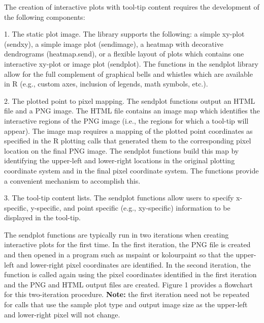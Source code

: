 \documentclass[]{article}
\begin{document}
\indent The creation of interactive plots with tool-tip content requires the development of the following components:
\begin{description}
\item 1. The static plot image. The library supports the following: a simple xy-plot (sendxy), a simple image plot (sendimage), a heatmap with decorative dendrograms (heatmap.send), or a flexible layout of plots which contains one interactive xy-plot or image plot (sendplot). The functions in the sendplot library allow for the full complement of graphical bells and whistles which are available in R (e.g., custom axes, inclusion of legends, math symbols, etc.). 
\item 2. The plotted point to pixel mapping. The sendplot functions output an HTML file and a PNG image. The HTML file contains an image map which identifies the interactive regions of the PNG image (i.e., the regions for which a tool-tip will appear). The image map requires a mapping of the plotted point coordinates as specified in the R plotting calls that generated them to the corresponding pixel location on the final PNG image. The sendplot functions build this map by identifying the upper-left and lower-right locations in the original plotting coordinate system and in the final pixel coordinate system. The functions provide a convenient mechanism to accomplish this.
\item 3. The tool-tip content lists. The sendplot functions allow users to specify  x-specific, y-specific, and point specific (e.g., xy-specific) information to be displayed in the tool-tip. 
\end{description}
The sendplot functions are typically run in two iterations when creating interactive plots for the first time. In the first iteration, the PNG file is created and then opened in a program such as mspaint or kolourpaint so that the upper-left and lower-right pixel coordinates are identified. In the second iteration, the function is called again using the pixel coordinates identified in the first iteration and the PNG and HTML output files are created. Figure 1 provides a flowchart for this two-iteration procedure. {\bf{Note:}} the first iteration need not be repeated for calls that use the sample plot type and output image size as the upper-left and lower-right pixel will not change. 
\end{document}
